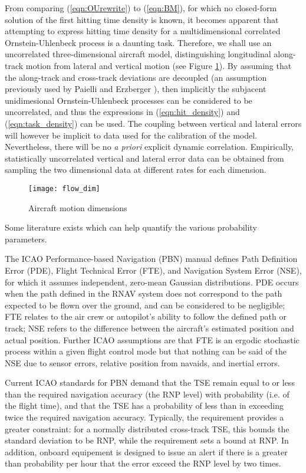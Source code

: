 \documentclass[conference]{IEEEtran}
\begin{document}
From comparing (\ref{eqn:OUrewrite}) to (\ref{eqn:BM}), for which no closed-form solution of the first hitting time density is known, it becomes apparent that attempting to express hitting time density for a multidimensional correlated Ornstein-Uhlenbeck process is a daunting task. Therefore, we shall use an uncorrelated three-dimensional aircraft model, distinguishing longitudinal along-track motion from lateral and vertical motion (see Figure \ref{fig:flow_dim}). By assuming that the along-track and cross-track deviations are decoupled (an assumption previously used by Paielli and Erzberger \cite{PaielliErzberger:1997}), then implicitly the subjacent unidimesional Ornstein-Uhlenbeck processes can be considered to be uncorrelated, and thus the expressions in (\ref{eqn:hit_density}) and (\ref{eqn:task_density}) can be used. The coupling between vertical and lateral errors will however be implicit to data used for the calibration of the model. Nevertheless, there will be no \emph{a priori} explicit dynamic correlation. Empirically, statistically uncorrelated vertical and lateral error data can be obtained from sampling the two dimensional data at different rates for each dimension.

\begin{figure}[!h]
\centering
\texttt{[image: flow\_dim]}
\caption{Aircraft motion dimensions}
\label{fig:flow_dim}
\end{figure}

Some literature exists which can help quantify the various probability parameters.

The ICAO Performance-based Navigation (PBN) manual \cite{PBN08} defines Path Definition Error (PDE), Flight Technical Error (FTE), and Navigation System Error (NSE), for which it assumes independent, zero-mean Gaussian distributions. PDE occurs when the path defined in the RNAV system does not correspond to the path expected to be flown over the ground, and can be considered to be negligible; FTE relates to the air crew or autopilot's ability to follow the defined path or track; NSE refers to the difference between the aircraft's estimated position and actual position. Further ICAO assumptions are that FTE is an ergodic stochastic process within a given flight control mode but that nothing can be said of the NSE due to sensor errors, relative position from navaids, and inertial errors.

Current ICAO standards for PBN demand that the TSE remain equal to or less than the required navigation accuracy (the RNP level) with  probability (i.e.  of the flight time), and that the TSE has a probability of less than  in exceeding twice the required navigation accuracy. Typically, the  requirement provides a greater constraint: for a normally distributed cross-track TSE, this bounds the standard deviation to be RNP, while the  requirement sets a bound at RNP. In addition, onboard equipement is designed to issue an alert if there is a greater than  probability per hour that the error exceed the RNP level by two times.
\end{document}
